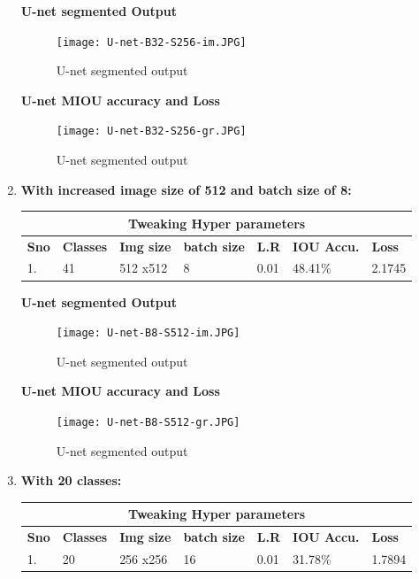 \documentclass{IEEEtran}
\begin{document}
\begin{enumerate}
\textbf{U-net segmented Output}

\begin{figure}[h]
    \centering
    \captionsetup{justification=centering}
    \texttt{[image: U-net-B32-S256-im.JPG]}
    \caption{U-net segmented output}
    \label{fig:Binary class segmented output}
\end{figure}

\textbf{U-net MIOU accuracy and Loss}

\begin{figure}[h]
    \centering
    \captionsetup{justification=centering}
    \texttt{[image: U-net-B32-S256-gr.JPG]}
    \caption{U-net segmented output}
    \label{fig:Binary class segmented output}
\end{figure}


\item \textbf{With increased image size of 512 and batch size of 8:}
\newline
\begin{tabular}{ |p{0.6cm}|p{1.2cm}|p{0.6cm}|p{0.6cm}|p{0.6cm}|p{0.8cm}|p{0.8cm}|}
 \hline
 \multicolumn{7}{|c|}{\textbf{Tweaking Hyper parameters}} \\
 \hline
 \textbf{Sno} & \textbf{Classes} & \textbf{Img size} & \textbf{batch size} & \textbf{L.R} & \textbf{IOU Accu.} & \textbf{Loss} \\
 \hline
 1. & 41   & 512 x512   & 8  & 0.01 & 48.41\% & 2.1745 \\
 \hline
\end{tabular}

\newpage

\textbf{U-net segmented Output}

\begin{figure}[h]
    \centering
    \captionsetup{justification=centering}
    \texttt{[image: U-net-B8-S512-im.JPG]}
    \caption{U-net segmented output}
    \label{fig:Binary class segmented output}
\end{figure}


\textbf{U-net MIOU accuracy and Loss}

\begin{figure}[h]
    \centering
    \captionsetup{justification=centering}
    \texttt{[image: U-net-B8-S512-gr.JPG]}
    \caption{U-net segmented output}
    \label{fig:Binary class segmented output}
\end{figure}

\item \textbf{With 20 classes:}
\newline
\begin{tabular}{ |p{0.6cm}|p{1.2cm}|p{0.6cm}|p{0.6cm}|p{0.6cm}|p{0.8cm}|p{0.8cm}|}
 \hline
 \multicolumn{7}{|c|}{\textbf{Tweaking Hyper parameters}} \\
 \hline
 \textbf{Sno} & \textbf{Classes} & \textbf{Img size} & \textbf{batch size} & \textbf{L.R} & \textbf{IOU Accu.} & \textbf{Loss} \\
 \hline
 1. & 20   & 256 x256   & 16  & 0.01 & 31.78\% & 1.7894 \\
 \hline
\end{tabular}



\end{enumerate}
\end{document}
